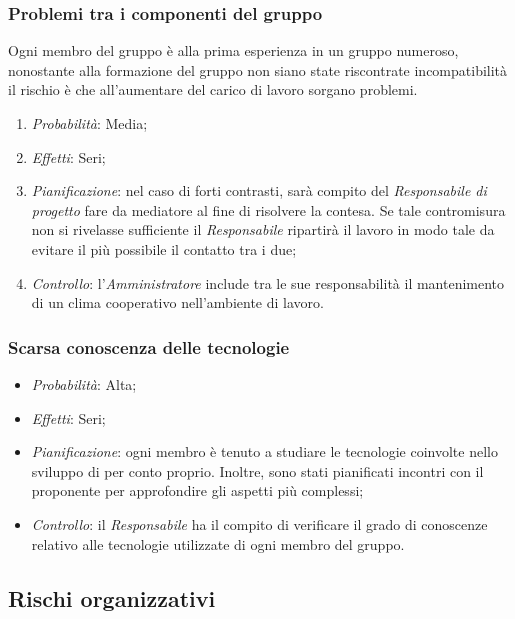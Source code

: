 		\subsubsection{Problemi tra i componenti del gruppo}

Ogni membro del gruppo è alla prima esperienza in un gruppo numeroso, nonostante alla formazione del gruppo non siano state riscontrate incompatibilità il rischio è che all'aumentare del carico di lavoro sorgano problemi.		
\begin{enumerate}
\item \textit{Probabilità}: Media;
\item \textit{Effetti}: Seri;
\item \textit{Pianificazione}: nel caso di forti contrasti, sarà compito del \textit{Responsabile di progetto} fare da mediatore al fine di risolvere la contesa. Se tale contromisura non si rivelasse sufficiente il \textit{Responsabile} ripartirà il lavoro in modo tale da evitare il più possibile il contatto tra i due;
\item \textit{Controllo}: l'\textit{Amministratore} include tra le sue responsabilità il mantenimento di un clima cooperativo nell'ambiente di lavoro.
\end{enumerate}	
		
		\subsubsection{Scarsa conoscenza delle tecnologie}
		
\begin{itemize}
\item \textit{Probabilità}: Alta;
\item \textit{Effetti}: Seri;
\item \textit{Pianificazione}: ogni membro è tenuto a studiare le tecnologie coinvolte nello sviluppo di \ProjectName{} per conto proprio. Inoltre, sono stati pianificati incontri con il proponente per approfondire gli aspetti più complessi;
\item \textit{Controllo}: il \textit{Responsabile} ha il compito di verificare il grado di conoscenze relativo alle tecnologie utilizzate di ogni membro del gruppo.
\end{itemize}	


	\subsection{Rischi organizzativi}
	
